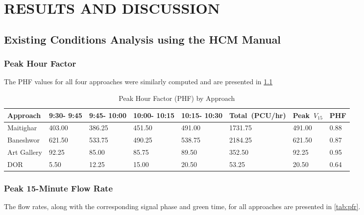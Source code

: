 \chapter{RESULTS AND DISCUSSION}


\section{Existing Conditions Analysis using the HCM Manual}

\subsection{Peak Hour Factor}
The PHF values for all four approaches were similarly computed and are 
presented in \cref{tab:phf}

\begin{table} [h!]
   \centering
   \caption{Peak Hour Factor (PHF) by Approach}
   \begin{tabular}{|p{2cm}|p{1.2cm}|p{1.2cm}|p{1.2cm}|p{1.2cm}|p{1.7cm}|p{1.2cm}|p{1.2cm}|}
   \hline
   Approach  & 9:30- 9:45 & 9:45- 10:00 & 10:00- 10:15 & 10:15- 10:30 & Total\ (PCU/hr) & Peak\ $V_{15}$ & PHF \\
   \hline
   Maitighar &403.00	&386.25	&451.50	&491.00	&1731.75	&491.00	&0.88 \\
   \hline
   Baneshwor & 621.50	&533.75	&490.25	&538.75	&2184.25	&621.50	&0.87 \\
   \hline
   Art Gallery &92.25	&85.00	&85.75	&89.50	&352.50	&92.25	&0.95 \\
   \hline
   DOR	& 5.50	&12.25	&15.00	&20.50	&53.25	&20.50	&0.64 \\
   \hline
   \end{tabular}
   \label{tab:phf}
\end{table}

\subsection{Peak 15-Minute Flow Rate}
The flow rates, along with the corresponding 
signal phase and green time, for all approaches are 
presented in \cref{tab:pfr}.

